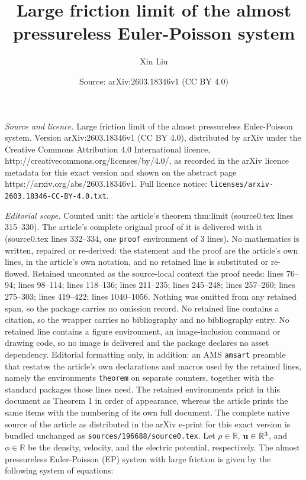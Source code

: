 \documentclass[10pt,a4paper]{amsart}
\title{Large friction limit of the almost pressureless Euler-Poisson system}
\author{Xin Liu}
\date{Source: arXiv:2603.18346v1 (CC BY 4.0)}
\renewcommand{\vec}[1]{{\bf #1}}
\begin{document}
\maketitle

\noindent\emph{Source and licence.} Large friction limit of the almost pressureless Euler-Poisson system. Version arXiv:2603.18346v1 (CC BY 4.0), distributed by arXiv under the Creative Commons Attribution 4.0 International licence, http://creativecommons.org/licenses/by/4.0/, as recorded in the arXiv licence metadata for this exact version and shown on the abstract page https://arxiv.org/abs/2603.18346v1. Full licence notice: \texttt{licenses/arxiv-2603.18346-CC-BY-4.0.txt}.\par\smallskip

\noindent\textit{Editorial scope.} Counted unit: the article's theorem thm:limit (source0.tex lines 315--330). The article's complete original proof of it is delivered with it (source0.tex lines 332--334, one \texttt{proof} environment of 3 lines). No mathematics is written, repaired or re-derived: the statement and the proof are the article's own lines, in the article's own notation, and no retained line is substituted or re-flowed.  Retained uncounted as the source-local context the proof needs: lines 76--94; lines 98--114; lines 118--136; lines 211--235; lines 245--248; lines 257--260; lines 275--303; lines 419--422; lines 1040--1056.  Nothing was omitted from any retained span, so the package carries no omission record.  No retained line contains a citation, so the wrapper carries no bibliography and no bibliography entry.  No retained line contains a figure environment, an image-inclusion command or drawing code, so no image is delivered and the package declares no asset dependency.  Editorial formatting only, in addition: an AMS \texttt{amsart} preamble that restates the article's own declarations and macros used by the retained lines, namely the environments \texttt{theorem} on separate counters, together with the standard packages those lines need.  The retained environments print in this document as Theorem 1 in order of appearance, whereas the article prints the same items with the numbering of its own full document.  The complete native source of the article as distributed in the arXiv e-print for this exact version is bundled unchanged as \texttt{sources/196688/source0.tex}.
Let $ \rho \in \mathbb R $, $\vec u \in \mathbb R^3$, and $ \phi \in \mathbb R $ be the density, velocity, and the electric potential, respectively. 
The almost pressureless Euler-Poisson (EP) system with large friction is given by the following system of equations: 
\end{document}
